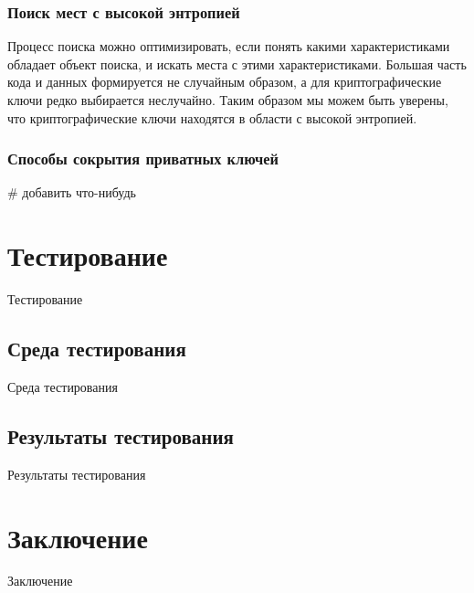 \documentclass[20pt]{article}
\begin{document}
\subsubsection{Поиск мест с высокой энтропией}

Процесс поиска можно оптимизировать, если понять какими характеристиками обладает объект поиска, и искать места с этими характеристиками. Большая часть кода и данных формируется не случайным образом, а для криптографические ключи редко выбирается неслучайно. Таким образом мы можем быть уверены, что криптографические ключи находятся в области с высокой энтропией.

\subsubsection{Способы сокрытия приватных ключей}
# добавить что-нибудь

\section{Тестирование}
Тестирование

\subsection{Среда тестирования}
Среда тестирования

\subsection{Результаты тестирования}
Результаты тестирования

\section{Заключение}
Заключение



\end{document}

